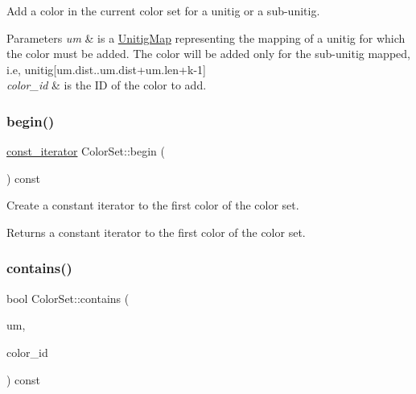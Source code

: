 Add a color in the current color set for a unitig or a sub-\/unitig. 


\begin{DoxyParams}{Parameters}
{\em um} & is a \hyperlink{structUnitigMap}{Unitig\+Map} representing the mapping of a unitig for which the color must be added. The color will be added only for the sub-\/unitig mapped, i.\+e, unitig\mbox{[}um.\+dist..um.\+dist+um.len+k-\/1\mbox{]} \\
\hline
{\em color\+\_\+id} & is the ID of the color to add. \\
\hline
\end{DoxyParams}
\mbox{\label{classColorSet_a39bcc44bcf47c9e31a27a5b4fd4c75d8}} 
\subsubsection{\texorpdfstring{begin()}{begin()}}
{\footnotesize\ttfamily \hyperlink{classColorSet_1_1ColorSet__const__iterator}{const\+\_\+iterator} Color\+Set\+::begin (\begin{DoxyParamCaption}{ }\end{DoxyParamCaption}) const\hspace{0.3cm}{\ttfamily [inline]}}



Create a constant iterator to the first color of the color set. 

\begin{DoxyReturn}{Returns}
a constant iterator to the first color of the color set. 
\end{DoxyReturn}
\mbox{\label{classColorSet_a192f572f4bffc3edff720045b4a8f41f}} 
\subsubsection{\texorpdfstring{contains()}{contains()}}
{\footnotesize\ttfamily bool Color\+Set\+::contains (\begin{DoxyParamCaption}\item[{const \hyperlink{structUnitigMap}{Unitig\+Map}$<$ Hash\+ID $>$ \&}]{um,  }\item[{const size\+\_\+t}]{color\+\_\+id }\end{DoxyParamCaption}) const}



